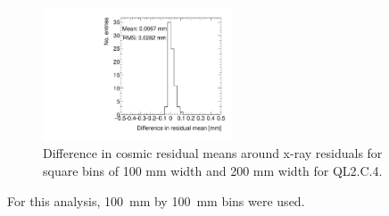 
\begin{figure}
    \centering
    \includegraphics[width = 0.5\textwidth]{figures/compare_residual_fits_around_xrays_QL2C04_3100V_2021-05-20_100mm_bins_minus_QL2C04_3100V_2021-06-02_200mm_bins_means_difference.pdf}
    \caption{Difference in cosmic residual means around x-ray residuals for square bins of 100 mm width and 200 mm width for QL2.C.4.}
    \label{fig:area_bin_size_mean_diff}
\end{figure}

For this analysis, \SI{100}{\milli\meter} by \SI{100}{\milli\meter} bins were used.



